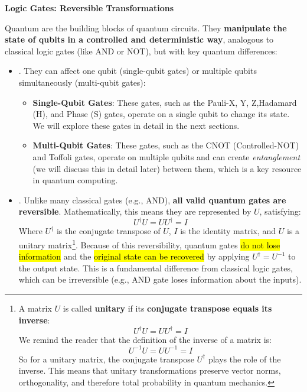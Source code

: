 \begin{flushleft}
    \textcolor{Green3}{ \textbf{Logic Gates: Reversible Transformations}}
\end{flushleft}
Quantum  are the building blocks of quantum circuits. They \textbf{manipulate the state of qubits in a controlled and deterministic way}, analogous to classical logic gates (like AND or NOT), but with key quantum differences:
\begin{itemize}
    \item {}. They can affect one qubit (single-qubit gates) or multiple qubits simultaneously (multi-qubit gates):
    \begin{itemize}
        \item \textbf{Single-Qubit Gates}: These gates, such as the Pauli-X, Y, Z,\break Hadamard (H), and Phase (S) gates, operate on a single qubit to change its state. We will explore these gates in detail in the next sections.
        \item \textbf{Multi-Qubit Gates}: These gates, such as the CNOT (Controlled-NOT) and Toffoli gates, operate on multiple qubits and can create \emph{entanglement} (we will discuss this in detail later) between them, which is a key resource in quantum computing.
    \end{itemize}


    \item {}. Unlike many classical gates (e.g., AND), \textbf{all valid quantum gates are reversible}. Mathematically, this means they are represented by  $U$, satisfying:
    \begin{equation*}
        U^\dagger U = U U^\dagger = I
    \end{equation*}
    Where $U^\dagger$ is the conjugate transpose of $U$, $I$ is the identity matrix, and $U$ is a unitary matrix\footnote{%
        A matrix $U$ is called \textbf{unitary} if its \textbf{conjugate transpose equals its inverse}:
        \begin{equation}\label{eq:unitary-matrix}
            U^\dagger U = U U^\dagger = I
        \end{equation}
        We remind the reader that the definition of the inverse of a matrix is:
        \begin{equation*}
            U^{-1} U = U U^{-1} = I
        \end{equation*}
        So for a unitary matrix, the conjugate transpose $U^\dagger$ plays the role of the inverse.
        This means that unitary transformations preserve vector norms, orthogonality, and therefore total probability in quantum mechanics.
    }. Because of this reversibility, quantum gates \hl{do not lose information} and the \hl{original state can be recovered} by applying $U^\dagger = U^{-1}$ to the output state. This is a fundamental difference from classical logic gates, which can be irreversible (e.g., AND gate loses information about the inputs).


\end{itemize}
